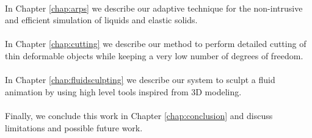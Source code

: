 \paragraph*{}
In Chapter \ref{chap:arps} we describe our adaptive technique for the non-intrusive and efficient simulation of liquids and elastic solids.
\paragraph*{}
In Chapter \ref{chap:cutting} we describe our method to perform detailed cutting of thin deformable objects while keeping a very low number of degrees of freedom.
\paragraph*{}
In Chapter \ref{chap:fluidsculpting} we describe our system to sculpt  a fluid animation by using high level tools inspired from 3D modeling.
\paragraph*{}
Finally, we conclude this work in Chapter \ref{chap:conclusion} and discuss limitations and possible future work.

